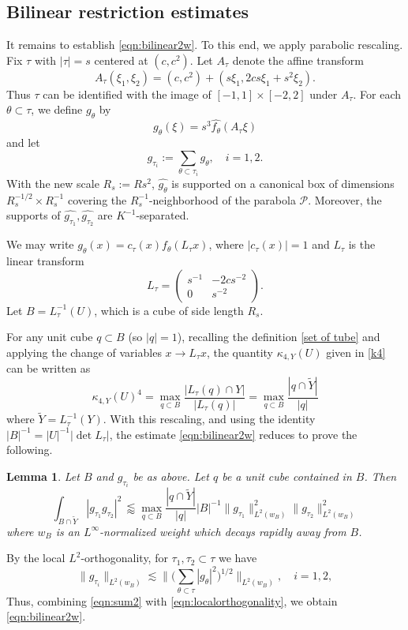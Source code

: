 \documentclass[11pt]{amsart}
\newtheorem{lemma}[theorem]{Lemma}
\theoremstyle{definition}
\theoremstyle{remark}
\renewcommand{\hat}{\widehat}
\newcommand{\les}{\lesssim}
\newcommand{\less}{\lessapprox}
\begin{document}
\subsection{Bilinear restriction estimates}
It remains to establish \eqref{eqn:bilinear2w}. To this end, we apply parabolic rescaling. Fix $\tau$ with $|\tau|=s$ centered at $(c,c^2)$. Let $A_\tau$ denote the affine transform 
\[ A_\tau (\xi_1,\xi_2) = (c,c^2) + (s\xi_1,2cs\xi_1+s^2 \xi_2). \]
Thus $\tau$ can be identified with the image of $[-1,1]\times [-2,2]$ under $A_\tau$. 
For each $\theta\subset \tau$, we define $g_\theta$ by 
\[ \hat{g_\theta}(\xi)=s^3 \hat{f_\theta}(A_\tau \xi) \]
and let 
\[
g_{\tau_i}:=\sum_{\theta \subset \tau_i} g_\theta, \quad i=1,2.
\]
With the new scale $R_s:=Rs^2$, $\widehat{g_\theta}$ is supported on a canonical box of dimensions $R_s^{-1/2}\times R_s^{-1}$ covering the $R_s^{-1}$-neighborhood of the parabola $\mathcal P$. Moreover, the supports of $\hat{g_{\tau_1}}, \hat{g_{\tau_2}}$ are $K^{-1}$-separated. 

We may write $g_\theta(x) = c_\tau(x) f_{\theta}(L_\tau x)$, where $|c_\tau(x)|=1$ and $L_\tau$ is the linear transform 
\begin{equation}\label{eqn:Ltau}
 L_\tau = \begin{pmatrix} s^{-1} & -2cs^{-2} \\ 0 & s^{-2}    
\end{pmatrix}.   
\end{equation}
Let $B=L_\tau^{-1}(U)$, which is a cube of side length $R_s$. 

For any unit cube $q\subset B$ (so $|q|=1$),
recalling the definition \eqref{set of tube} and applying the change of variables $x\rightarrow L_\tau x$,
the quantity $\kappa_{4,Y}(U)$ given in \eqref{k4} can be written as
\[
\kappa_{4,Y}(U)^4=\max_{q\subset B} \frac{|L_\tau(q)\cap Y|}{|L_\tau(q)|}
=\max_{q\subset B} \frac{|q\cap \widetilde Y|}{|q|}
\]
where $\widetilde Y=L_\tau^{-1}(Y)$. 
With this rescaling, and using the identity $|B|^{-1}=|U|^{-1}|\det L_\tau|$, the estimate \eqref{eqn:bilinear2w} reduces to prove the following.

\begin{lemma}\label{lem:l4}
Let $B$ and $g_{\tau_i}$ be as above. Let $q$ be a unit cube contained in $B$. Then
\begin{equation}\label{eqn:sum2}
\int_{B\cap \widetilde Y} |g_{\tau_1}g_{\tau_2}|^2\, \less \max_{q\subset B} \frac{|q\cap \widetilde Y|}{|q|} |B|^{-1}  \| g_{\tau_1} \|_{L^2(w_B)}^{2} \| g_{\tau_2}  \|_{L^2(w_B)}^{2}
\end{equation}
where $w_B$ is an $L^\infty$-normalized weight which decays rapidly away from $B$.
\end{lemma}
By the local $L^2$-orthogonality, for $\tau_1,\tau_2\subset \tau$ we have
\begin{equation}\label{eqn:localorthogonality}
	\| g_{\tau_i}  \|_{L^2(w_B)}  \les  
	\big\| \big(\sum_{\theta \subset \tau} |g_{\theta}|^2 \big)^{1/2} \big\|_{L^2(w_B)}, \quad i=1,2,
\end{equation}
Thus, combining \eqref{eqn:sum2} with \eqref{eqn:localorthogonality}, we obtain \eqref{eqn:bilinear2w}.
\end{document}
